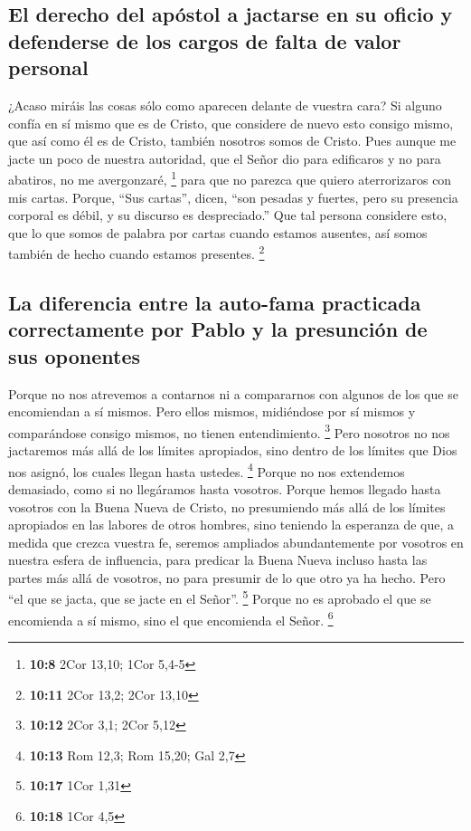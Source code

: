 \begin{paracol}{2}
\hypertarget{el-derecho-del-apuxf3stol-a-jactarse-en-su-oficio-y-defenderse-de-los-cargos-de-falta-de-valor-personal}{%
\subsection{El derecho del apóstol a jactarse en su oficio y defenderse
de los cargos de falta de valor
personal}\label{el-derecho-del-apuxf3stol-a-jactarse-en-su-oficio-y-defenderse-de-los-cargos-de-falta-de-valor-personal}}

 ¿Acaso miráis las cosas sólo como aparecen delante de
vuestra cara? Si alguno confía en sí mismo que es de Cristo, que
considere de nuevo esto consigo mismo, que así como él es de Cristo,
también nosotros somos de Cristo.  Pues aunque me jacte un
poco de nuestra autoridad, que el Señor dio para edificaros y no para
abatiros, no me avergonzaré, \footnote{\textbf{10:8} 2Cor 13,10; 1Cor
  5,4-5}  para que no parezca que quiero aterrorizaros con
mis cartas.  Porque, ``Sus cartas'', dicen, ``son pesadas
y fuertes, pero su presencia corporal es débil, y su discurso es
despreciado.''  Que tal persona considere esto, que lo
que somos de palabra por cartas cuando estamos ausentes, así somos
también de hecho cuando estamos presentes. \footnote{\textbf{10:11} 2Cor
  13,2; 2Cor 13,10}

\hypertarget{la-diferencia-entre-la-auto-fama-practicada-correctamente-por-pablo-y-la-presunciuxf3n-de-sus-oponentes}{%
\subsection{La diferencia entre la auto-fama practicada correctamente
por Pablo y la presunción de sus
oponentes}\label{la-diferencia-entre-la-auto-fama-practicada-correctamente-por-pablo-y-la-presunciuxf3n-de-sus-oponentes}}

 Porque no nos atrevemos a contarnos ni a compararnos con
algunos de los que se encomiendan a sí mismos. Pero ellos mismos,
midiéndose por sí mismos y comparándose consigo mismos, no tienen
entendimiento. \footnote{\textbf{10:12} 2Cor 3,1; 2Cor 5,12}
 Pero nosotros no nos jactaremos más allá de los límites
apropiados, sino dentro de los límites que Dios nos asignó, los cuales
llegan hasta ustedes. \footnote{\textbf{10:13} Rom 12,3; Rom 15,20; Gal
  2,7}  Porque no nos extendemos demasiado, como si no
llegáramos hasta vosotros. Porque hemos llegado hasta vosotros con la
Buena Nueva de Cristo,  no presumiendo más allá de los
límites apropiados en las labores de otros hombres, sino teniendo la
esperanza de que, a medida que crezca vuestra fe, seremos ampliados
abundantemente por vosotros en nuestra esfera de influencia,
 para predicar la Buena Nueva incluso hasta las partes
más allá de vosotros, no para presumir de lo que otro ya ha hecho.
 Pero ``el que se jacta, que se jacte en el Señor''.
\footnote{\textbf{10:17} 1Cor 1,31}  Porque no es
aprobado el que se encomienda a sí mismo, sino el que encomienda el
Señor. \footnote{\textbf{10:18} 1Cor 4,5}


\end{paracol}

